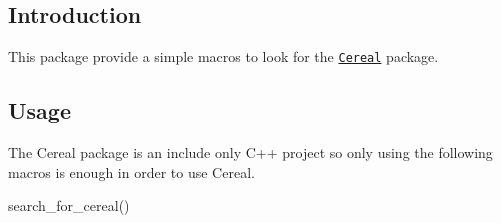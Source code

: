 \subsection*{Introduction}

This package provide a simple macros to look for the \href{http://uscilab.github.io/cereal/index.html}{\tt Cereal} package.

\subsection*{Usage}

The Cereal package is an include only C++ project so only using the following macros is enough in order to use Cereal. \begin{DoxyVerb}search_for_cereal() \end{DoxyVerb}
 